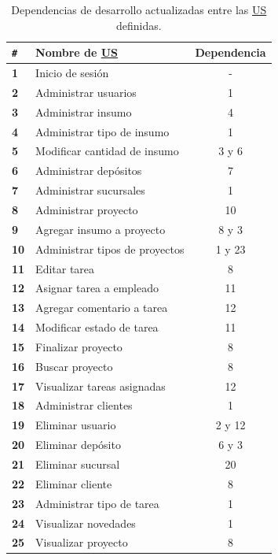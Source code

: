 \documentclass[a4paper, 12pt,twoside]{report}  %
\numberwithin{equation}{subsection} %
\begin{document}
\begin{table}[h!]
	\centering
	\begin{tabular}{ |p{0.5cm}|p{9cm}|c|  }
		\hline
		\verb|#|& \textbf{Nombre de \hyperlink{US}{US}}& \textbf{Dependencia} \\
		\hline
		\textbf{1} & \cellcolor{marca_US_realizada_anterior}Inicio de sesión & - \\
		\hline
		\textbf{2} & \cellcolor{marca_US_realizada_anterior}Administrar usuarios & 1 \\
		\hline
		\textbf{3} & \cellcolor{marca_US_realizada}Administrar insumo & 4 \\
		\hline
		\textbf{4} & \cellcolor{marca_US_realizada}Administrar tipo de insumo & 1 \\
		\hline
		\textbf{5} & \cellcolor{marca_US_realizada}Modificar cantidad de insumo & 3 y 6 \\
		\hline
		\textbf{6} & \cellcolor{marca_US_realizada_anterior}Administrar depósitos & 7 \\
		\hline
		\textbf{7} & \cellcolor{marca_US_realizada_anterior}Administrar sucursales & 1 \\
		\hline
		\textbf{8} & Administrar proyecto & 10 \\
		\hline
		\textbf{9} & Agregar insumo a proyecto & 8 y 3 \\
		\hline
		\textbf{10} & Administrar tipos de proyectos & 1 y 23 \\
		\hline
		\textbf{11} & Editar tarea & 8 \\
		\hline
		\textbf{12} & Asignar tarea a empleado & 11\\
		\hline
		\textbf{13} & Agregar comentario a tarea & 12 \\
		\hline
		\textbf{14} & Modificar estado de tarea & 11 \\
		\hline
		\textbf{15} & Finalizar proyecto & 8 \\
		\hline
		\textbf{16} & Buscar proyecto & 8 \\
		\hline
		\textbf{17} & Visualizar tareas asignadas & 12 \\
		\hline
		\textbf{18} & \cellcolor{marca_US_realizada_anterior}Administrar clientes & 1 \\
		\hline
		\textbf{19} & Eliminar usuario & 2 y 12 \\
		\hline
		\textbf{20} & Eliminar depósito & 6 y 3 \\
		\hline
		\textbf{21} & Eliminar sucursal & 20 \\
		\hline
		\textbf{22} & Eliminar cliente & 8 \\
		\hline
		\textbf{23} & \cellcolor{marca_US_realizada}Administrar tipo de tarea & 1 
		\\
		\hline
		\textbf{24} & \cellcolor{marca_US_realizada}Visualizar novedades & 1 
		\\
		\hline
		\textbf{25} & Visualizar proyecto & 8 
		\\
		\hline
	\end{tabular}
	\caption{Dependencias de desarrollo actualizadas entre las \protect\hyperlink{US}{US} definidas.}
	\label{tabla_dependencias_us_it2}
\end{table}
\end{document}
